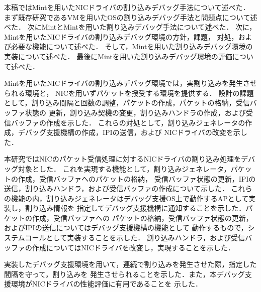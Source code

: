\documentclass[submit,techreq,noauthor,dvipdfmx]{ipsj}
\begin{document}
本稿ではMintを用いたNICドライバの割り込みデバッグ手法について述べた．
まず既存研究であるVMを用いたOSの割り込みデバッグ手法と問題点について述べた．
次にMintとMintを用いた割り込みデバッグ手法について述べた．
次に，Mintを用いたNICドライバの割り込みデバッグ環境の方針，課題，
対処，および必要な機能について述べた．
そして，Mintを用いた割り込みデバッグ環境の実装について述べた．
最後にMintを用いた割り込みデバッグ環境の評価について述べた．

Mintを用いたNICドライバの割り込みデバッグ環境では，実割り込みを発生させられる環境と，
NICを用いずパケットを授受する環境を提供する．
設計の課題として，割り込み間隔と回数の調整，パケットの作成，パケットの格納，受信バッファ状態の
更新，割り込み契機の変更，割り込みハンドラの作成，および受信バッファの作成を示した．
これらの対処として，割り込みジェネレータの作成，デバッグ支援機構の作成，IPIの送信，および
NICドライバの改変を示した．

本研究ではNICのパケット受信処理に対するNICドライバの割り込み処理をデバッグ対象とした．
これを実現する機能として，割り込みジェネレータ，パケットの作成，受信バッファへのパケットの格納，
受信バッファ状態の更新，IPIの送信，割り込みハンドラ，および受信バッファの作成について示した．
これらの機能の内，割り込みジェネレータはデバッグ支援OS上で動作するAPとして実装し，割り込み情報を
指定してデバッグ支援機構に通知することを示した．パケットの作成，受信バッファへの
パケットの格納，受信バッファ状態の更新，およびIPIの送信についてはデバッグ支援機構の機能として
動作するもので，システムコールとして実装することを示した．
割り込みハンドラ，および受信バッファの作成についてはNICドライバを改変し，実現することを示した．

実装したデバッグ支援環境を用いて，連続で割り込みを発生させた際，指定した間隔を守って，割り込みを
発生させられることを示した．また，本デバッグ支援環境がNICドライバの性能評価に有用であることを
示した．


\end{document}
